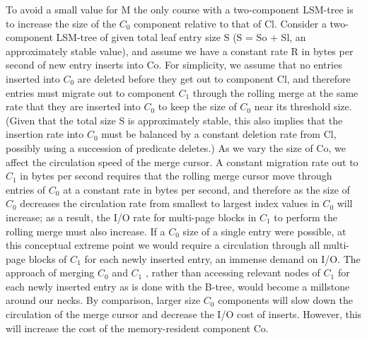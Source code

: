 \documentclass[a4paper,12pt,notitlepage,twoside,openright]{article}
\begin{document}
To avoid a small value for M the only course with a two-component
LSM-tree is to increase the size of the \(C_0\) component relative to that of
Cl. Consider a two-component LSM-tree of given total leaf entry size S
(S = So + Sl, an approximately stable value), and assume we have a
constant rate R in bytes per second of new entry inserts into Co. For
simplicity, we assume that no entries inserted into \(C_0\) are deleted
before they get out to component Cl, and therefore entries must migrate
out to component \(C_1\) through the rolling merge at the same rate that they
are inserted into \(C_0\) to keep the size of \(C_0\) near its threshold size.
(Given that the total size S is approximately stable, this also implies
that the insertion rate into \(C_0\) must be balanced by a constant deletion
rate from Cl, possibly using a succession of predicate deletes.) As we
vary the size of Co, we affect the circulation speed of the merge
cursor. A constant migration rate out to \(C_1\) in bytes per second requires
that the rolling merge cursor move through entries of \(C_0\) at a constant
rate in bytes per second, and therefore as the size of \(C_0\) decreases the
circulation rate from smallest to largest index values in \(C_0\) will
increase; as a result, the I/O rate for multi-page blocks in \(C_1\) to
perform the rolling merge must also increase. If a \(C_0\) size of a single
entry were possible, at this conceptual extreme point we would require a
circulation through all multi-page blocks of \(C_1\) for each newly inserted
entry, an immense demand on I/O. The approach of merging \(C_0\) and \(C_1\) ,
rather than accessing relevant nodes of \(C_1\) for each newly inserted entry
as is done with the B-tree, would become a millstone around our necks.
By comparison, larger size \(C_0\) components will slow down the circulation
of the merge cursor and decrease the I/O cost of inserts. However, this
will increase the cost of the memory-resident component Co.
\end{document}
